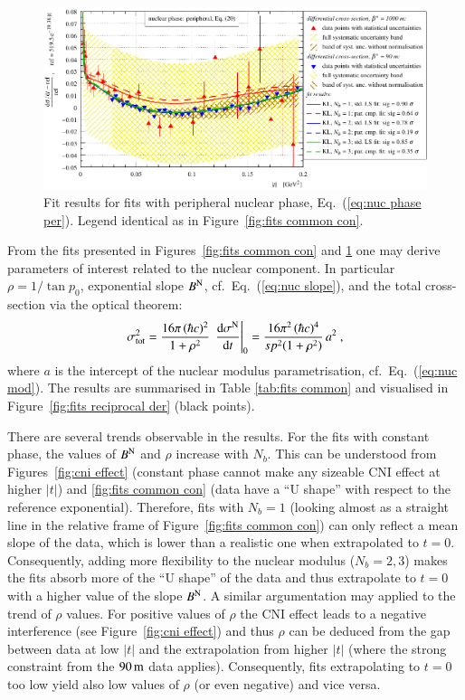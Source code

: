 \begin{figure}
\begin{center}
\includegraphics{fig/fits_common_per.pdf}
\caption{%
Fit results for fits with peripheral nuclear phase, Eq.~(\ref{eq:nuc phase per}). Legend identical as in Figure~\ref{fig:fits common con}. 
}
\label{fig:fits common per}
\end{center}
\end{figure}


From the fits presented in Figures~\ref{fig:fits common con} and \ref{fig:fits common per} one may derive parameters of interest related to the nuclear component. In particular $\rho = 1 / \tan p_0$, exponential slope $B^{\rm N}$, cf.~Eq.~(\ref{eq:nuc slope}), and the total cross-section via the optical theorem:
\begin{equation}
\label{eq:si tot}
\sigma_{\rm tot}^2 = {16\pi\, (\hbar c)^2\over 1 + \rho^2}\, \left. \d\sigma^{\rm N}\over\d t\right|_0
		= {16\pi^2\, (\hbar c)^4\over s p^2 (1+\rho^2)}\, a^2\ ,
\end{equation}
where $a$ is the intercept of the nuclear modulus parametrisation, cf.~Eq.~(\ref{eq:nuc mod}). The results are summarised in Table \ref{tab:fits common} and visualised in Figure~\ref{fig:fits reciprocal der} (black points).

There are several trends observable in the results. For the fits with constant phase, the values of $B^{\rm N}$ and $\rho$ increase with $N_b$. This can be understood from Figures~\ref{fig:cni effect} (constant phase cannot make any sizeable CNI effect at higher $|t|$) and \ref{fig:fits common con} (data have a ``U shape'' with respect to the reference exponential). Therefore, fits with $N_b = 1$ (looking almost as a straight line in the relative frame of Figure~\ref{fig:fits common con}) can only reflect a mean slope of the data, which is lower than a realistic one when extrapolated to $t = 0$. Consequently, adding more flexibility to the nuclear modulus ($N_b = 2, 3$) makes the fits absorb more of the ``U shape'' of the data and thus extrapolate to $t = 0$ with a higher value of the slope $B^{\rm N}$. A similar argumentation may applied to the trend of $\rho$ values. For positive values of $\rho$ the CNI effect leads to a negative interference (see Figure~\ref{fig:cni effect}) and thus $\rho$ can be deduced from the gap between data at low $|t|$ and the extrapolation from higher $|t|$ (where the strong constraint from the $90\,{\rm m}$ data applies). Consequently, fits extrapolating to $t = 0$ too low yield also low values of $\rho$ (or even negative) and vice versa.

